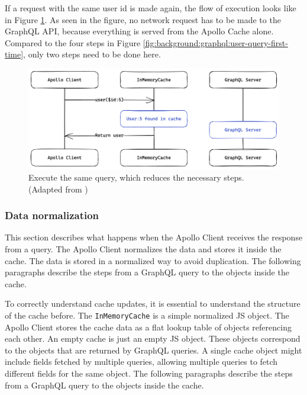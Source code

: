 \noindent If a request with the same user id is made again, the flow of execution looks like in Figure \ref{fig:background:graphql:user-query-second-time}. As seen in the figure, no network request has to be made to the GraphQL \ac{API}, because everything is served from the Apollo Cache alone. Compared to the four steps in Figure \ref{fig:background:graphql:user-query-first-time}, only two steps need to be done here. \cite{misc:-:background:graphql:apollo-client-cache-overview}

\ifshowImages
\begin{figure}[H]
  \centering
  \includegraphics[width=0.7\linewidth]{images/background/graphql/apollo/apollo-client-basic-cache-warm.png}
  \caption{Execute the same query, which reduces the necessary steps. (Adapted from \cite{misc:-:background:graphql:apollo-client-cache-overview})}\label{fig:background:graphql:user-query-second-time}
\end{figure}
\fi

\subsubsection{Data normalization}\label{subsubsection:background:graphql:apollo-server-client:data-normalization}

This section describes what happens when the Apollo Client receives the response from a query. The Apollo Client normalizes the data and stores it inside the cache. The data is stored in a normalized way to avoid duplication. The following paragraphs describe the steps from a GraphQL query to the objects inside the cache.

\bigskip

\noindent To correctly understand cache updates, it is essential to understand the structure of the cache before. The \texttt{InMemoryCache} is a simple normalized \ac{JS} object. The Apollo Client stores the cache data as a flat lookup table of objects referencing each other. An empty cache is just an empty \ac{JS} object. These objects correspond to the objects that are returned by GraphQL queries. A single cache object might include fields fetched by multiple queries, allowing multiple queries to fetch different fields for the same object. \cite{misc:-:background:graphql:apollo-client-cache-overview} The following paragraphs describe the steps from a GraphQL query to the objects inside the cache.

